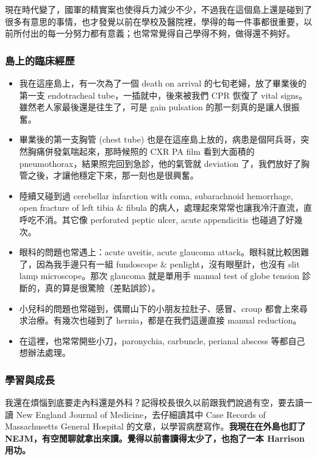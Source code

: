 \documentclass[12pt,a4paper]{article}
\begin{document}
現在時代變了，國軍的精實案也使得兵力減少不少，不過我在這個島上還是碰到了很多有意思的事情，也才發覺以前在學校及醫院裡，學得的每一件事都很重要，以前所付出的每一分努力都有意義；也常常覺得自己學得不夠，做得還不夠好。

\subsubsection{島上的臨床經歷}

\begin{itemize}
    \item 我在這座島上，有一次為了一個 death on arrival 的七旬老婦，放了畢業後的第一支 endotracheal tube，一插就中，後來被我們 CPR 恢復了 vital signs。雖然老人家最後還是往生了，可是 gain pulsation 的那一刻真的是讓人很振奮。

    \item 畢業後的第一支胸管 (chest tube) 也是在這座島上放的，病患是個阿兵哥，突然胸痛併發氣喘起來，那時候照的 CXR PA film 看到大面積的 pneumothorax，結果照完回到急診，他的氣管就 deviation 了，我們放好了胸管之後，才讓他穩定下來，那一刻也是很興奮。

    \item 陸續又碰到過 cerebellar infarction with coma, subarachnoid hemorrhage, open fracture of left tibia \& fibula 的病人，處理起來常常也讓我冷汗直流，直呼吃不消。其它像 perforated peptic ulcer, acute appendicitis 也碰過了好幾次。

    \item 眼科的問題也常遇上：acute uveitis, acute glaucoma attack。眼科就比較困難了，因為我手邊只有一組 fundoscope \& penlight，沒有眼壓計，也沒有 slit lamp microscope。那次 glaucoma 就是單用手 manual test of globe tension 診斷的，真的算是很驚險（差點誤診）。

    \item 小兒科的問題也常碰到，偶爾山下的小朋友拉肚子、感冒、croup 都會上來尋求治療。有幾次也碰到了 hernia，都是在我們這邊直接 manual reduction。

    \item 在這裡，也常常開些小刀，paronychia, carbuncle, perianal abscess 等都自己想辦法處理。
\end{itemize}

\subsubsection{學習與成長}

我還在煩惱到底要走內科還是外科？記得校長很久以前跟我們說過有空，要去讀一讀 New England Journal of Medicine，去仔細讀其中 Case Records of Massachusetts General Hospital 的文章，以學習病歷寫作。\textbf{我現在在外島也訂了 NEJM，有空閒聊就拿出來讀。覺得以前書讀得太少了，也抱了一本 Harrison 用功。}
\end{document}
